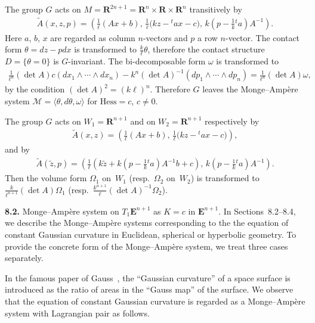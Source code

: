 \documentclass[pdftex]{sigma}
\begin{document}
\begin{Rem}
The group $G$ acts on $M = {\mathbf{R}}^{2n+1} = {\mathbf{R}}^n \times {\mathbf{R}} \times {\mathbf{R}}^n$ transitively by
\begin{gather*}
\widetilde{A}(x, z, p) = \left(\frac{1}{\ell}(Ax + b), \, \frac{1}{\ell}\big(kz - {}^t\!ax - c\big), \, k\left(p - \frac{1}{k}{}^t\!a\right)A^{-1}\right).
\end{gather*}
Here $a$, $b$, $x$ are regarded as column $n$-vectors and $p$ a row $n$-vector.
The contact form $\theta = dz - pdx$ is transformed to
$\frac{k}{\ell}\theta$, therefore
the contact structure $D=\{ \theta =0 \}$ is $G$-invariant.
The bi-decomposable form $\omega$ is transformed to
\begin{gather*}
\frac{1}{\ell^n}(\det A)c(dx_1\wedge \cdots \wedge dx_{n})
-
k^n(\det A)^{-1}(dp_1\wedge \cdots \wedge dp_{n}) = \frac{1}{\ell^n}(\det A)  \omega,
\end{gather*}
by the condition $(\det A)^2 = (k\ell)^n$.
Therefore $G$ leaves the Monge--Amp{\`e}re system ${\mathcal M} = \langle \theta, d\theta, \omega\rangle$
for ${\mathrm{Hess}} = c$, $c \not= 0$.

The group $G$ acts on $W_1 = {\mathbf{R}}^{n+1}$ and on $W_2={\mathbf{R}}^{n+1}$ respectively by
\begin{gather*}
\widetilde{A}(x, z) = \left(\frac{1}{\ell}(Ax + b), \, \frac{1}{\ell}\big(kz - {}^t\!ax - c\big)\right),
\end{gather*}
and by
\begin{gather*}
\widetilde{A}(\tilde{z}, p) = \left(\frac{1}{\ell}\left(k\tilde{z} + k\left(p - \frac{1}{k}{}^t\!a\right)A^{-1}b + c\right), \, k\left(p - \frac{1}{k}{}^t\!a\right)A^{-1}\right).
\end{gather*}
Then the volume form $\Omega_1$ on~$W_1$ (resp.~$\Omega_2$ on~$W_2$)
is transformed to $\frac{k}{\ell^{n+1}}(\det A)\Omega_1$ (resp.\ $\frac{k^{n+1}}{\ell}(\det A)^{-1}\Omega_2$).
\end{Rem}


{\bf 8.2.}
Monge--Amp{\`e}re system on $T_1{\mathbf{E}}^{n+1}$
as $K=c$ in ${\mathbf{E}}^{n+1}$.
In Sections~8.2--8.4, we describe
the Monge--Amp{\`e}re systems corresponding to the
the equation of constant Gaussian curvature in Euclidean, spherical or hyperbolic geometry.
To provide the concrete form of the Monge--Amp{\`e}re system, we treat three cases separately.


In the famous paper of Gauss~\cite{S},
the ``Gaussian curvature'' of a space surface
is introduced
as the ratio of areas in the ``Gauss map'' of the surface.
We observe that the equation of constant Gaussian curvature is
regarded as a Monge--Amp{\`e}re system with Lagrangian pair as follows.
\end{document}
